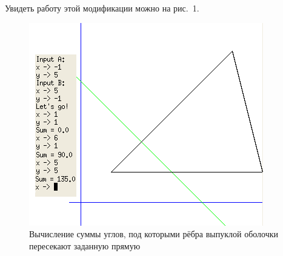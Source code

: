 Увидеть работу этой модификации можно на рис.~1.

\begin{figure}[ht!]
\begin{center}
\includegraphics[scale=0.6]{images/111}
\end{center}
\vspace*{-8mm}
\caption{Вычисление суммы углов, под которыми рёбра выпуклой оболочки пересекают заданную прямую}\label{fig:term_1}
\end{figure}
